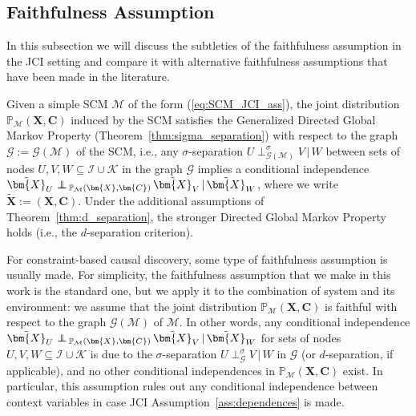 \documentclass[twoside,11pt]{article}
\DeclareMathOperator*{\CI}{{\,\perp\mkern-12mu\perp\,}}
\DeclareMathOperator*{\SEP}{\perp}
\newcommand\indep[4]{{#1} \CI_{#4} {#2} \given {#3}}
\newcommand{\dsep}[4]{{#1} \SEP_{#4}^d {#2} \given {#3}}
\newcommand{\sigmasep}[4]{{#1} \SEP_{#4}^\sigma {#2} \given {#3}}
\newcommand{\Prb}{\mathbb{P}}
\newcommand\B[1]{\bm{#1}}
\newcommand\C[1]{\mathcal{#1}}
\newcommand\BC[1]{\bm{\mathcal{#1}}}
\newcommand\given{\,|\,}
\newcommand\eref[1]{(\ref{#1})}
\newcommand{\Joris}[1]{{\color{blue}#1}}
\newcommand{\Sara}[1]{{\color{purple}#1}}
\begin{document}
\subsection{Faithfulness Assumption}\label{sec:faithfulness}

In this subsection we will discuss the subtleties of the faithfulness assumption in the JCI setting and compare
it with alternative faithfulness assumptions that have been made in the literature.

Given a simple SCM $\C{M}$ of the form \eref{eq:SCM_JCI_ass}, the joint distribution $\Prb_{\C{M}}(\B{X},\B{C})$ induced by the SCM satisfies the Generalized Directed Global Markov Property (Theorem~\ref{thm:sigma_separation}) with respect to the graph $\C{G} := \C{G}(\C{M})$ of the SCM, i.e., any $\sigma$-separation $\sigmasep{U}{V}{W}{\C{G}(\C{M})}$ between sets of nodes $U,V,W \subseteq \C{I}\cup\C{K}$ in the graph $\C{G}$ implies a conditional independence $\indep{\tilde{\B{X}}_U}{\tilde{\B{X}}_V}{\tilde{\B{X}}_W}{\Prb_{\C{M}}(\B{X},\B{C})}$, where we write $\tilde{\B{X}} := (\B{X},\B{C})$. Under the additional assumptions of
Theorem~\ref{thm:d_separation}, the stronger Directed Global Markov Property holds (i.e., the $d$-separation criterion).

For constraint-based causal discovery, some type of faithfulness assumption is usually made. For simplicity, the faithfulness assumption that we make in this work is the standard one, but we apply it to the combination of system and its environment: we assume that the joint distribution $\Prb_{\C{M}}(\B{X},\B{C})$ is faithful with respect to the graph $\C{G}(\C{M})$ of $\C{M}$. In other words, any conditional independence $\indep{\tilde{\B{X}}_U}{\tilde{\B{X}}_V}{\tilde{\B{X}}_W}{\Prb_{\C{M}}(\B{X},\B{C})}$ for sets of nodes $U,V,W \subseteq \C{I}\cup\C{K}$ is due to the $\sigma$-separation $\sigmasep{U}{V}{W}{\C{G}}$ in $\C{G}$ (or $d$-separation, if applicable), and no other conditional independences in $\Prb_{\C{M}}(\B{X},\B{C})$ exist.
In particular, this assumption rules out any conditional independence between context variables in case JCI Assumption~\ref{ass:dependences} is made.
\end{document}
